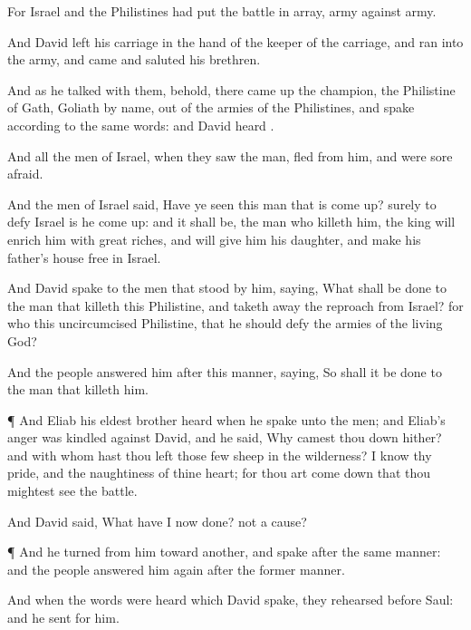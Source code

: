{For
Israel and the
Philistines had put the battle in
array,
army
against
army.

And
David
left his
carriage in the
hand of the
keeper of the
carriage, and
ran into the
army, and
came and
saluted his
brethren.

And as he
talked with them, behold, there came
up the
champion, the
Philistine of
Gath,
Goliath by
name, out of the
armies of the
Philistines, and
spake according to the
same
words: and
David
heard
{}.

And all the
men of
Israel, when they
saw the
man,
fled from
him, and were
sore
afraid.

And the
men of
Israel
said, Have ye
seen this
man that is come
up? surely to
defy
Israel is he come
up: and it shall be,
{} the
man who
killeth him, the
king will
enrich him with
great
riches, and will
give him his
daughter, and
make his
father’s
house
free in
Israel.

And
David
spake to the
men that
stood by him,
saying, What shall be
done to the
man that
killeth
this
Philistine, and taketh
away the
reproach from
Israel? for who
{} this
uncircumcised
Philistine, that he should
defy the
armies of the
living
God?

And the
people
answered him after this
manner,
saying, So shall it be
done to the
man that
killeth him.


\par }{\PP {}¶ And
Eliab his
eldest
brother
heard when he
spake unto the
men; and
Eliab’s
anger was
kindled against
David, and he
said, Why camest thou
down hither? and with whom hast thou
left
those
few
sheep in the
wilderness? I
know thy
pride, and the
naughtiness of thine
heart; for thou art come
down that thou mightest
see the
battle.

And
David
said, What have I now
done?
{} not a
cause?


\par }{\PP {}¶ And he
turned from
him
toward
another, and
spake after the same
manner: and the
people
answered him
again after the
former
manner.


\par }{\PP {}And when the
words were
heard which
David
spake, they
rehearsed
{}
before
Saul: and he
sent for him.


}
